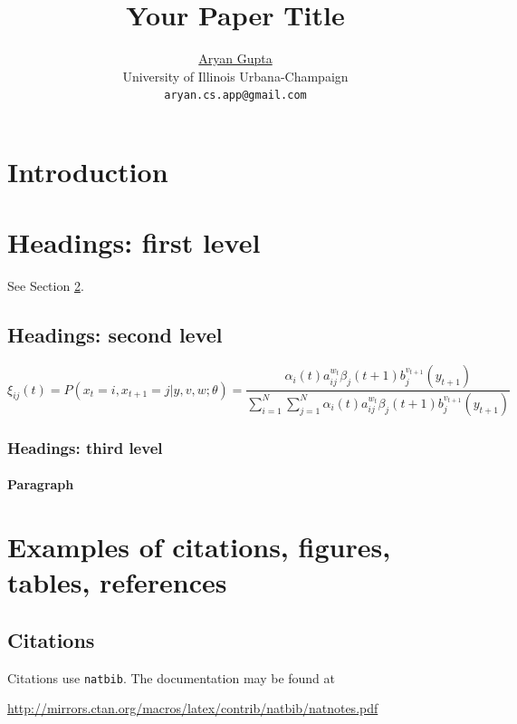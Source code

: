 \documentclass{article}
\title{Your Paper Title}
\date{}   %
\author{
  \href{https://orcid.org/0009-0005-1413-3773}{Aryan Gupta} \\
  University of Illinois Urbana-Champaign \\
  \texttt{aryan.cs.app@gmail.com} \\
}
\begin{document}
\maketitle

\begin{abstract}
	\lipsum[1]
\end{abstract}


\section{Introduction}
\lipsum[2]
\lipsum[3]


\section{Headings: first level}
\label{sec:headings}

\lipsum[4] See Section \ref{sec:headings}.

\subsection{Headings: second level}
\lipsum[5]
\begin{equation}
	\xi _{ij}(t)=P(x_{t}=i,x_{t+1}=j|y,v,w;\theta)= {\frac {\alpha _{i}(t)a^{w_t}_{ij}\beta _{j}(t+1)b^{v_{t+1}}_{j}(y_{t+1})}{\sum _{i=1}^{N} \sum _{j=1}^{N} \alpha _{i}(t)a^{w_t}_{ij}\beta _{j}(t+1)b^{v_{t+1}}_{j}(y_{t+1})}}
\end{equation}

\subsubsection{Headings: third level}
\lipsum[6]

\paragraph{Paragraph}
\lipsum[7]


\section{Examples of citations, figures, tables, references}
\label{sec:others}

\subsection{Citations}
Citations use \verb+natbib+. The documentation may be found at
\begin{center}
	\url{http://mirrors.ctan.org/macros/latex/contrib/natbib/natnotes.pdf}
\end{center}
\end{document}
